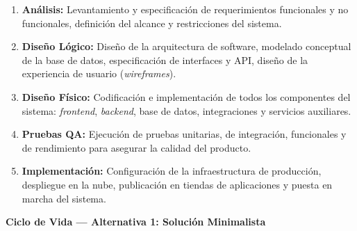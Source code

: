 \documentclass[12pt]{article}
\begin{document}
\begin{enumerate}
    \item \textbf{Análisis:} Levantamiento y especificación de requerimientos funcionales y no funcionales, definición del alcance y restricciones del sistema.
    \item \textbf{Diseño Lógico:} Diseño de la arquitectura de software, modelado conceptual de la base de datos, especificación de interfaces y API, diseño de la experiencia de usuario (\textit{wireframes}).
    \item \textbf{Diseño Físico:} Codificación e implementación de todos los componentes del sistema: \textit{frontend}, \textit{backend}, base de datos, integraciones y servicios auxiliares.
    \item \textbf{Pruebas QA:} Ejecución de pruebas unitarias, de integración, funcionales y de rendimiento para asegurar la calidad del producto.
    \item \textbf{Implementación:} Configuración de la infraestructura de producción, despliegue en la nube, publicación en tiendas de aplicaciones y puesta en marcha del sistema.
\end{enumerate}
\newpage
\textbf{Ciclo de Vida --- Alternativa 1: Solución Minimalista}
\end{document}
